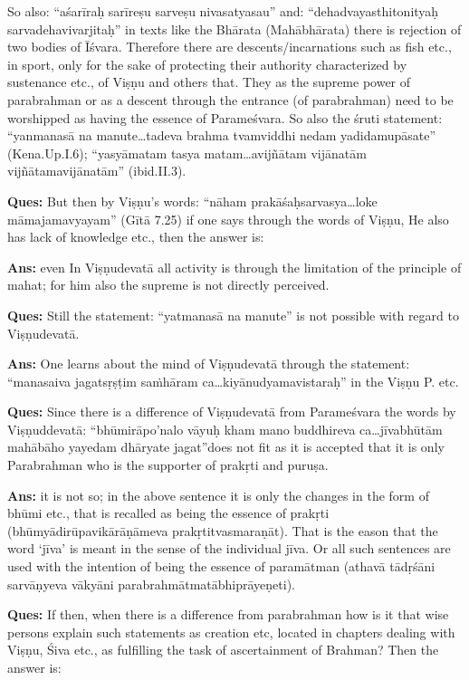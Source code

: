 So also: “aśarīraḥ sarīreṣu sarveṣu nivasatyasau” and: “dehadvayasthitonityaḥ sarvadehavivarjitaḥ” in texts like the Bhārata (Mahābhārata) there is rejection of two bodies of Īśvara.  Therefore there are descents/\-incarnations such as fish etc., in sport, only for the sake of protecting their authority characterized by sustenance etc., of Viṣṇu and others that. They as the supreme power of parabrahman or as a descent through the entrance (of parabrahman) need to be worshipped as having the essence of Parameśvara. So also the śruti statement: “yanmanasā na manute…tadeva brahma tvamviddhi nedam yadidamupā\-sate” (Kena.Up.I.6); “yasyāmatam tasya matam…avijñātam vijānatām vijñātamavijānatām” (ibid.II.3).

\textbf{Ques:} But then by Viṣṇu’s words: “nāham prakāśaḥsarvasya…loke māmajamavyayam” (Gītā 7.25) if one says through the words of Viṣṇu, He also has lack of knowledge etc., then the answer is: 

\textbf{Ans:} even In Viṣṇudevatā all activity is through the limitation of the principle of mahat; for him also the supreme is not directly perceived.  

\textbf{Ques:} Still the statement: “yatmanasā na manute” is not possible with regard to Viṣṇudevatā. 

\textbf{Ans:} One learns about the mind of Viṣṇudevatā through the statement: “manasaiva jagatsṛṣṭim saṁhāram ca…kiyānudyamavistaraḥ” in the Viṣṇu P. etc. 

\textbf{Ques:} Since there is a difference of Viṣṇudevatā from Parameśvara the words by Viṣṇuddevatā: “bhūmirāpo’nalo vāyuḥ kham mano buddhireva ca…jīvabhūtām mahābāho yayedam dhāryate jagat”does not fit as it is accepted that it is only Parabrahman who is the supporter of prakṛti and puruṣa.

\textbf{Ans:} it is not so; in the above sentence it is only the changes in the form of bhūmi etc., that is recalled as being the essence of prakṛti (bhūmyādirūpavikārāṇāmeva prakṛtitvasmaraṇāt). That is the eason that the word ‘jīva’ is meant in the sense of the individual jīva. Or all such sentences are used with the intention of being the essence of paramātman (athavā tādṛśāni sarvāṇyeva vākyāni parabrahmātmatābhiprāyeṇeti).

\textbf{Ques:} If then, when there is a difference from parabrahman how is it that  wise persons explain such statements as creation etc, located in chapters dealing with Viṣṇu, Śiva etc., as fulfilling the task of ascertainment of Brahman? Then the answer is:

